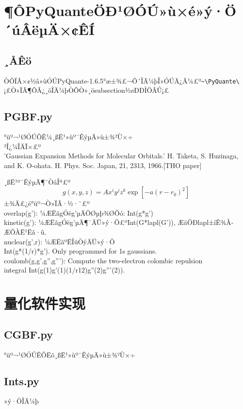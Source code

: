 \section{¶ÔPyQuanteÖÐ¹ØÓÚ»ù×é»ý·Ö´úÂëµÄ×¢ÊÍ}
\subsection{¸ÅÊö}
ÒÔÏÂ×¢½â»ùÓÚPyQuante-1.6.5°æ±¾£¬Ô´ÎÄ¼þÎ»ÓÚÄ¿Â¼£º\verb"~\PyQuante\"¡£Ò»ÏÂ¶ÔÃ¿¸öÎÄ¼þÒÔÒ»¸ösubsection½øÐÐÌÖÂÛ¡£







\subsection{PGBF.py}
°üº¬¹ØÓÚÔ­Ê¼¸ßË¹»ùº¯ÊýµÄ»ù±¾²Ù×÷\\
²Î¿¼ÎÄÏ×£º\\
'Gaussian Expansion Methods for Molecular Orbitals.' H. Taketa, S. Huzinaga, and K. O-ohata. H. Phys. Soc. Japan, 21, 2313, 1966.[THO paper]


¸ßË¹º¯ÊýµÄ¶¨ÒåÎª£º
\begin{equation}
g(x,y,z)=Ax^{i}y^{j}z^{k}\exp{[-a(r-r_0)^2]}
\end{equation}
±¾Ä£¿é°üº¬Ò»ÏÂ·½·¨£º\\
overlap(g'): ¼ÆËãgÓëg'µÄÖØµþ¾ØÕó: Int(g*g')\\
kinetic(g'): ¼ÆËãgÓëg'µÄ¶¯ÄÜ»ý·Ö£ºInt(G*lapl(G')), ÆäÖÐlapl±íÊ¾À­ÆÕÀ­Ë¹Ëã·û.\\
nuclear(g',r): ¼ÆËãºËÎüÒýÄÜ»ý·Ö\\
Int(g*(1/r)*g'). Only programmed for 1s gaussians.\\
coulomb(g,g',g'',g'''): Compute the two-electron colombic repulsion\\
integral Int(g(1)g'(1)(1/r12)g''(2)g'''(2)). \\


\section{量化软件实现}

\subsection{CGBF.py}
°üº¬¹ØÓÚÊÕËõ¸ßË¹»ùº¯ÊýµÄ»ù±¾²Ù×÷


\subsection{Ints.py}
»ý·ÖÎÄ¼þ


